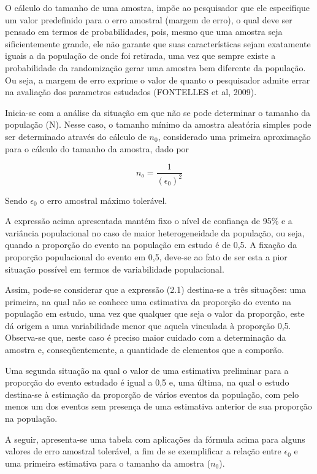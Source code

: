 \inic O cálculo do tamanho de uma amostra, impõe ao pesquisador
que ele especifique um valor predefinido para o erro amostral
(margem de erro), o qual deve ser pensado em termos de
probabilidades, pois, mesmo que uma amostra seja sificientemente
grande, ele não garante que suas características sejam exatamente
iguais a da população de onde foi retirada, uma vez que sempre
existe a probabilidade da randomização gerar uma amostra bem
diferente da população. Ou seja, a margem de erro exprime o valor
de quanto o pesquisador admite errar na avaliação dos parametros
estudados (FONTELLES et al, 2009).\vskip0.3cm

Inicia-se com a análise da situação em que não se pode determinar
o tamanho da população (N). Nesse caso, o tamanho mínimo da
amostra aleatória simples pode ser determinado através do cálculo
de $n_{0}$, considerado uma primeira aproximação para o cálculo do
tamanho da amostra, dado por


\begin{equation}\label{nzero}
    n_{o}=\frac{1}{\left(\epsilon_{0}\right)^2}
\end{equation}

Sendo $\epsilon_{0}$ o erro amostral máximo tolerável.\vskip0.3cm

A expressão acima apresentada mantém fixo o nível de confiança de 95\% e a variância populacional no caso de maior heterogeneidade da população, ou seja, quando a proporção do evento na população em estudo é de 0,5. A fixação da proporção populacional do evento em 0,5, deve-se ao fato de ser esta a pior situação possível em termos de variabilidade populacional. \vskip0.3cm

Assim, pode-se considerar que a expressão (2.1) destina-se a três
situações: uma primeira, na qual não se conhece uma estimativa da
proporção do evento na população em estudo, uma vez que qualquer
que seja o valor da proporção, este dá origem a uma variabilidade
menor que aquela vinculada à proporção 0,5. Observa-se que, neste
caso é preciso maior cuidado com a determinação da amostra e,
conseqüentemente, a quantidade de elementos que a
comporão.\vskip0.3cm

Uma segunda situação na qual o valor de uma estimativa preliminar para a proporção do evento estudado é igual a 0,5 e, uma última, na qual o estudo destina-se à estimação da proporção de vários eventos da população, com pelo menos um dos eventos sem presença de uma estimativa anterior de sua proporção na população.\vskip0.3cm


\newpage
A seguir, apresenta-se uma tabela com aplicações da fórmula acima para alguns valores de erro amostral tolerável, a fim de se exemplificar a relação entre $\epsilon_{0}$ e uma primeira estimativa para o tamanho da amostra ($n_{0}$).




